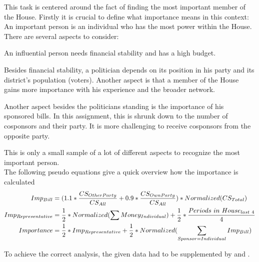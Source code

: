 \begin{homeworkProblem}
  This task is centered around the fact of finding the most important member of the House. Firstly it is crucial to define what importance means in this context:\\

  An important person is an individual who has the most power within the House. There are several aspects to consider:
  \begin{description}[labelindent=1cm]
    \item[Money] An influential person needs financial stability and has a high budget.
    \item[Reelections] Besides financial stability, a politician depends on its position in his party and its district's population (voters). Another aspect is that a member of the House gains more importance with his experience and the broader network.
    \item[Bills] Another aspect besides the politicians standing is the importance of his sponsored bills. In this assignment, this is shrunk down to the number of cosponsors and their party. It is more challenging to receive cosponsors from the opposite party.
  \end{description}
  This is only a small sample of a lot of different aspects to recognize the most important person.\\

  The following pseudo equations give a quick overview how the importance is calculated
      \begin{align}
      Imp_{Bill} & = (1.1 * \frac{CS_{Other Party}}{CS_{All}} + 0.9 * \frac{CS_{Own Party}}{CS_{All}}) * Normalized(CS_{Total})  \\
      Imp_{Representative} & = \frac{1}{2} * Normalized(\sum Money_{Individual}) + \frac{1}{2} * \frac{Periods~in~House_{last~4}}{4}\\
      Importance & = \frac{1}{2} * Imp_{Representative} + \frac{1}{2} * Normalized(\sum_{Sponsor = \newline Individual} Imp_{Bill})
    \end{align}

To achieve the correct analysis, the given data had to be supplemented by \cite{ProPublica:bills} and \cite{ProPublica:expenses}.\\


\end{homeworkProblem}
